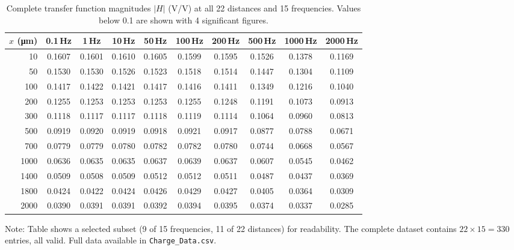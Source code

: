 \begin{table}[htbp]
\centering
\caption{Complete transfer function magnitudes $|H|$ (V/V) at all 22
distances and 15 frequencies. Values below \num{0.1} are shown with 4
significant figures.}
\label{tab:full-data}
\footnotesize
\setlength{\tabcolsep}{3pt}
\begin{tabular}{@{}r|ccc|ccc|ccc@{}}
\toprule
$x$ (\si{\um}) & 0.1\,Hz & 1\,Hz & 10\,Hz & 50\,Hz & 100\,Hz & 200\,Hz & 500\,Hz & 1000\,Hz & 2000\,Hz \\
\midrule
10   & 0.1607 & 0.1601 & 0.1610 & 0.1605 & 0.1599 & 0.1595 & 0.1526 & 0.1378 & 0.1169 \\
50   & 0.1530 & 0.1530 & 0.1526 & 0.1523 & 0.1518 & 0.1514 & 0.1447 & 0.1304 & 0.1109 \\
100  & 0.1417 & 0.1422 & 0.1421 & 0.1417 & 0.1416 & 0.1411 & 0.1349 & 0.1216 & 0.1040 \\
200  & 0.1255 & 0.1253 & 0.1253 & 0.1253 & 0.1255 & 0.1248 & 0.1191 & 0.1073 & 0.0913 \\
300  & 0.1118 & 0.1117 & 0.1117 & 0.1118 & 0.1119 & 0.1114 & 0.1064 & 0.0960 & 0.0813 \\
500  & 0.0919 & 0.0920 & 0.0919 & 0.0918 & 0.0921 & 0.0917 & 0.0877 & 0.0788 & 0.0671 \\
700  & 0.0779 & 0.0779 & 0.0780 & 0.0782 & 0.0782 & 0.0780 & 0.0744 & 0.0668 & 0.0567 \\
1000 & 0.0636 & 0.0635 & 0.0635 & 0.0637 & 0.0639 & 0.0637 & 0.0607 & 0.0545 & 0.0462 \\
1400 & 0.0509 & 0.0508 & 0.0509 & 0.0512 & 0.0512 & 0.0511 & 0.0487 & 0.0437 & 0.0369 \\
1800 & 0.0424 & 0.0422 & 0.0424 & 0.0426 & 0.0429 & 0.0427 & 0.0405 & 0.0364 & 0.0309 \\
2000 & 0.0390 & 0.0391 & 0.0391 & 0.0392 & 0.0394 & 0.0395 & 0.0374 & 0.0337 & 0.0285 \\
\bottomrule
\end{tabular}

\vspace{0.5em}
\footnotesize
Note: Table shows a selected subset (9 of 15 frequencies, 11 of 22 distances)
for readability. The complete dataset contains $22 \times 15 = 330$ entries,
all valid. Full data available in \texttt{Charge\_Data.csv}.
\end{table}
